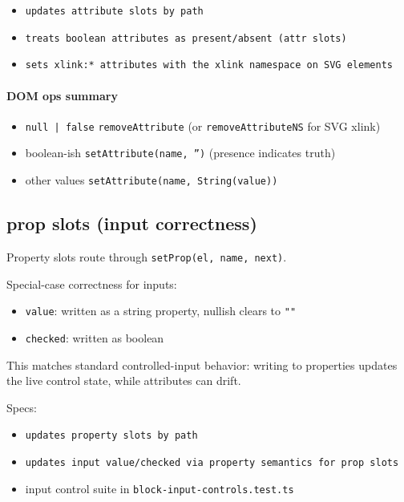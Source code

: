 \begin{itemize}
  \item \texttt{updates attribute slots by path}
  \item \texttt{treats boolean attributes as present/absent (attr slots)}
  \item \texttt{sets xlink:* attributes with the xlink namespace on SVG elements}
\end{itemize}

\paragraph{DOM ops summary}

\begin{itemize}
  \item \texttt{null | false} \textrightarrow \texttt{removeAttribute} (or \texttt{removeAttributeNS} for SVG xlink)
  \item boolean-ish \textrightarrow \texttt{setAttribute(name, '')} (presence indicates truth)
  \item other values \textrightarrow \texttt{setAttribute(name, String(value))}
\end{itemize}

\subsection{prop slots (input correctness)}

Property slots route through \texttt{setProp(el, name, next)}.

Special-case correctness for inputs:

\begin{itemize}
  \item \texttt{value}: written as a string property, nullish clears to \texttt{""}
  \item \texttt{checked}: written as boolean
\end{itemize}

This matches standard controlled-input behavior: writing to properties updates the live control state, while attributes can drift.

Specs:

\begin{itemize}
  \item \texttt{updates property slots by path}
  \item \texttt{updates input value/checked via property semantics for prop slots}
  \item input control suite in \texttt{block-input-controls.test.ts}
\end{itemize}


